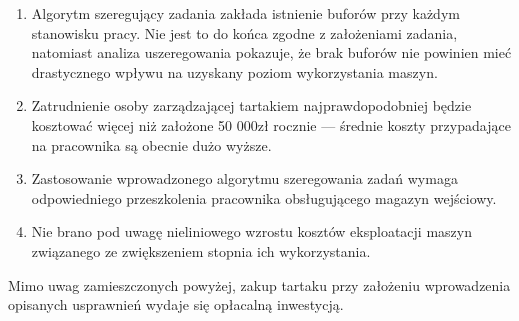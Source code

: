 \documentclass{article}
\begin{document}
\begin{enumerate}
	\item{Algorytm szeregujący zadania zakłada istnienie buforów przy każdym stanowisku pracy.
	Nie jest to do końca zgodne z założeniami zadania, natomiast analiza uszeregowania pokazuje, że brak buforów nie powinien mieć drastycznego wpływu na uzyskany poziom wykorzystania maszyn.}
	\item{Zatrudnienie osoby zarządzającej tartakiem najprawdopodobniej będzie kosztować więcej niż założone 50 000zł rocznie --- średnie koszty przypadające na pracownika są obecnie dużo wyższe.}
	\item{Zastosowanie wprowadzonego algorytmu szeregowania zadań wymaga odpowiedniego przeszkolenia pracownika obsługującego magazyn wejściowy.}
	\item{Nie brano pod uwagę nieliniowego wzrostu kosztów eksploatacji maszyn związanego ze zwiększeniem stopnia ich wykorzystania.}
\end{enumerate}

Mimo uwag zamieszczonych powyżej, zakup tartaku przy założeniu wprowadzenia opisanych usprawnień wydaje się opłacalną inwestycją.
\end{document}
